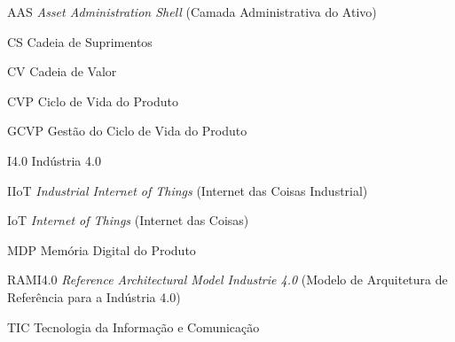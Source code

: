 \documentclass[
	12pt,				%
	oneside,			%
	a4paper,			%
	english,			%
	brazil				%
]{abntex2}
\begin{document}
\listoffigures*
\cleardoublepage



\listoftables*
\cleardoublepage

\begin{siglas}
	\item[AAS] \textit{Asset Administration Shell} (Camada Administrativa do Ativo)
	\item[CS] Cadeia de Suprimentos
	\item[CV] Cadeia de Valor
	\item[CVP] Ciclo de Vida do Produto
	\item[GCVP] Gestão do Ciclo de Vida do Produto
	\item[I4.0] Indústria 4.0
	\item[IIoT] \textit{Industrial Internet of Things} (Internet das Coisas Industrial)
	\item[IoT] \textit{Internet of Things} (Internet das Coisas)
	\item[MDP] Memória Digital do Produto
	\item[RAMI4.0] \textit{Reference Architectural Model Industrie 4.0} (Modelo de Arquitetura de Referência para a Indústria 4.0)
  	\item[TIC] Tecnologia da Informação e Comunicação
  	
  	
  	
\end{siglas}


\tableofcontents*
\cleardoublepage
\end{document}
